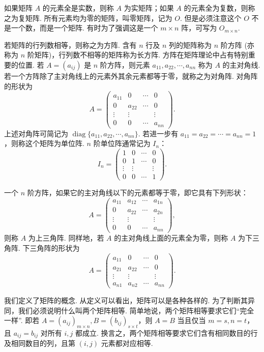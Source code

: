 \documentclass[UTF8,12pt,a4paper,fontset=fandol]{ctexart}
\begin{document}
如果矩阵 $A$ 的元素全是实数，则称 $A$ 为实矩阵；如果 $A$ 的元素全为复数，则称之为复矩阵. 所有元素均为零的矩阵，叫零矩阵，记为 $O$. 但是必须注意这个 $O$ 不是一个数，而是一个矩阵. 有时为了强调这是一个 $m\times n$ 阵，可写为 $O_{m\times n}$.

若矩阵的行列数相等，则称之为方阵. 含有 $n$ 行及 $n$ 列的矩阵称为 $n$ 阶方阵 (亦称为 $n$ 阶矩阵)，行列数不相等的矩阵称为长方阵. 方阵在矩阵理论中占有特别重要的位置. 若 $A=(a_{ij})$ 是 $n$ 阶方阵，则元素 $a_{11},a_{22},\cdots,a_{nn}$ 称为 $A$ 的主对角线. 若一个方阵除了主对角线上的元素外其余元素都等于零，就称之为对角阵. 对角阵的形状为
\[
A=
\left(\begin{array}{cccc}
a_{11} & 0 & \cdots & 0\\
0 & a_{22} & \cdots & 0\\
\vdots & \vdots & & \vdots\\
0 & 0 & \cdots & a_{nn}
\end{array}\right).
\]
上述对角阵可简记为 $\operatorname{diag}\{a_{11},a_{22},\cdots,a_{nn}\}$. 若进一步有 $a_{11}=a_{22}=\cdots=a_{nn}=1$，则称这个矩阵为单位阵. $n$ 阶单位阵通常记为 $I_n$：
\[
I_n=
\left(\begin{array}{cccc}
1 & 0 & \cdots & 0\\
0 & 1 & \cdots & 0\\
\vdots & \vdots & & \vdots\\
0 & 0 & \cdots & 1
\end{array}\right).
\]

一个 $n$ 阶方阵，如果它的主对角线以下的元素都等于零，即它具有下列形状：
\[
A=
\left(\begin{array}{cccc}
a_{11} & a_{12} & \cdots & a_{1n}\\
0 & a_{22} & \cdots & a_{2n}\\
\vdots & \vdots & & \vdots\\
0 & 0 & \cdots & a_{nn}
\end{array}\right),
\]
则称 $A$ 为上三角阵. 同样地，若 $A$ 的主对角线上面的元素全为零，则称 $A$ 为下三角阵. 下三角阵的形状为
\[
A=
\left(\begin{array}{cccc}
a_{11} & 0 & \cdots & 0\\
a_{21} & a_{22} & \cdots & 0\\
\vdots & \vdots & & \vdots\\
a_{n1} & a_{n2} & \cdots & a_{nn}
\end{array}\right).
\]

我们定义了矩阵的概念. 从定义可以看出，矩阵可以是各种各样的. 为了判断其异同，我们必须说明什么叫两个矩阵相等. 简单地说，两个矩阵相等要求它们``完全一样''. 即若 $A=(a_{ij})_{m\times n}, B=(b_{ij})_{s\times t}$，则 $A=B$ 当且仅当 $m=s,n=t$，且 $a_{ij}=b_{ij}$ 对所有 $i,j$ 都成立. 换言之，两个矩阵相等要求它们含有相同数目的行及相同数目的列，且第 $(i,j)$ 元素都对应相等.
\end{document}
